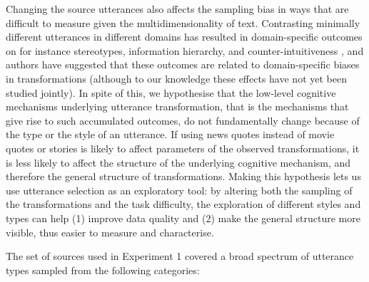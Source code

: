 Changing the source utterances also affects the sampling bias in ways
that are difficult to measure given the multidimensionality of text.
Contrasting minimally different utterances in different domains has
resulted in domain-specific outcomes on for instance stereotypes,
information hierarchy, and counter-intuitiveness
\autocites{kashima_maintaining_2000}{mesoudi_bias_2006}{barrett_spreading_2001}{mesoudi_multiple_2008},
and authors have suggested that these outcomes are related to
domain-specific biases in transformations (although to our knowledge
these effects have not yet been studied jointly). In spite of this, we
hypothesise that the low-level cognitive mechanisms underlying utterance
transformation, that is the mechanisms that give rise to such
accumulated outcomes, do not fundamentally change because of the type or
the style of an utterance. If using news quotes instead of movie quotes
or stories is likely to affect parameters of the observed
transformations, it is less likely to affect the structure of the
underlying cognitive mechanism, and therefore the general structure of
transformations. Making this hypothesis lets us use utterance selection
as an exploratory tool: by altering both the sampling of the
transformations and the task difficulty, the exploration of different
styles and types can help (1) improve data quality and (2) make the
general structure more visible, thus easier to measure and characterise.

The set of sources used in Experiment 1 covered a broad spectrum of
utterance types sampled from the following categories:

